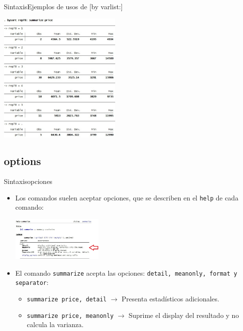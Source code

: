 \documentclass{beamer}
\begin{document}
\begin{frame}{Sintaxis}{Ejemplos de usos de [by varlist:]}
\centerline{\includegraphics[height=6.5cm]{bysort.jpg}}
\end{frame}


\subsection{options}

\begin{frame}{Sintaxis}{opciones}
\begin{itemize}
\item Los comandos suelen aceptar opciones, que se describen en el \texttt{help} de cada comando:\\
\centerline{\includegraphics[height=2.2cm]{option.jpg}}
\item El comando \texttt{summarize} acepta las opciones: \texttt{detail, meanonly, format y separator}: 
\begin{itemize}
\item \texttt{summarize price, detail} \hspace{0.3 cm} $\rightarrow$  Presenta estadísticos adicionales.
\item \texttt{summarize price, meanonly} \hspace{0.3 cm} $\rightarrow$  Suprime el display del resultado y no calcula la varianza. 
\end{itemize}
\end{itemize}
\end{frame}
\end{document}

